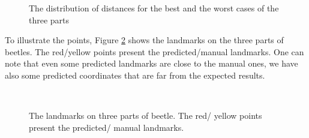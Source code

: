 \documentclass[review]{elsarticle}
\begin{document}
\begin{figure}[h!]
\hspace{0.5cm}
    \caption{The distribution of distances for the best and the worst cases of the three parts}
    \label{figprodist}
\end{figure}

To illustrate the points, Figure \ref{figeb1} shows the landmarks on the three parts of beetles. The red/yellow points present the predicted/manual landmarks. One can note that even some predicted landmarks are close to the manual ones, we have also some predicted coordinates that are far from the expected results.

\begin{figure}[h!]
	\centering
    ~~
	~~
    \caption{The landmarks on three parts of beetle. The red/ yellow points present the predicted/ manual landmarks.}
    \label{figeb1}
\end{figure}
\end{document}

